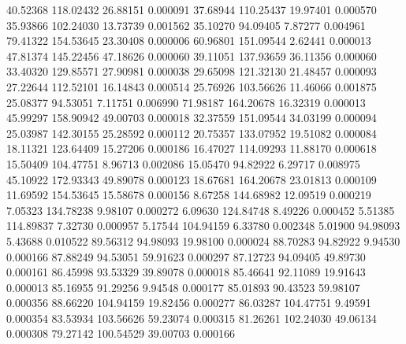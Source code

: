        40.52368      118.02432       26.88151       0.000091
       37.68944      110.25437       19.97401       0.000570
       35.93866      102.24030       13.73739       0.001562
       35.10270       94.09405        7.87277       0.004961
       79.41322      154.53645       23.30408       0.000006
       60.96801      151.09544        2.62441       0.000013
       47.81374      145.22456       47.18626       0.000060
       39.11051      137.93659       36.11356       0.000060
       33.40320      129.85571       27.90981       0.000038
       29.65098      121.32130       21.48457       0.000093
       27.22644      112.52101       16.14843       0.000514
       25.76926      103.56626       11.46066       0.001875
       25.08377       94.53051        7.11751       0.006990
       71.98187      164.20678       16.32319       0.000013
       45.99297      158.90942       49.00703       0.000018
       32.37559      151.09544       34.03199       0.000094
       25.03987      142.30155       25.28592       0.000112
       20.75357      133.07952       19.51082       0.000084
       18.11321      123.64409       15.27206       0.000186
       16.47027      114.09293       11.88170       0.000618
       15.50409      104.47751        8.96713       0.002086
       15.05470       94.82922        6.29717       0.008975
       45.10922      172.93343       49.89078       0.000123
       18.67681      164.20678       23.01813       0.000109
       11.69592      154.53645       15.58678       0.000156
	8.67258      144.68982       12.09519       0.000219
	7.05323      134.78238        9.98107       0.000272
	6.09630      124.84748        8.49226       0.000452
	5.51385      114.89837        7.32730       0.000957
	5.17544      104.94159        6.33780       0.002348
	5.01900       94.98093        5.43688       0.010522
       89.56312       94.98093       19.98100       0.000024
       88.70283       94.82922        9.94530       0.000166
       87.88249       94.53051       59.91623       0.000297
       87.12723       94.09405       49.89730       0.000161
       86.45998       93.53329       39.89078       0.000018
       85.46641       92.11089       19.91643       0.000013
       85.16955       91.29256        9.94548       0.000177
       85.01893       90.43523       59.98107       0.000356
       88.66220      104.94159       19.82456       0.000277
       86.03287      104.47751        9.49591       0.000354
       83.53934      103.56626       59.23074       0.000315
       81.26261      102.24030       49.06134       0.000308
       79.27142      100.54529       39.00703       0.000166
